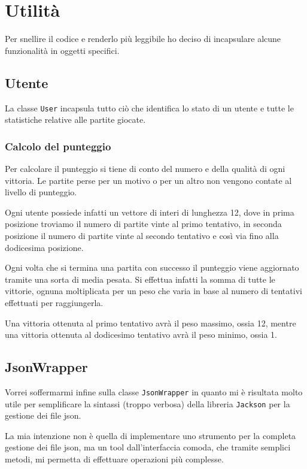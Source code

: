 \section{Utilità}
Per snellire il codice e renderlo più leggibile ho deciso di incapsulare alcune funzionalità in
oggetti specifici.

\subsection{Utente}
La classe \verb|User| incapsula tutto ciò che identifica lo stato di un utente e tutte le
statistiche relative alle partite giocate.

\subsubsection{Calcolo del punteggio}
Per calcolare il punteggio si tiene di conto del numero e della qualità di ogni vittoria. Le
partite perse per un motivo o per un altro non vengono contate al livello di punteggio.

Ogni utente possiede infatti un vettore di interi di lunghezza 12, dove in prima posizione troviamo
il numero di partite vinte al primo tentativo, in seconda posizione il numero di partite vinte al
secondo tentativo e così via fino alla dodicesima posizione.

Ogni volta che si termina una partita con successo il punteggio viene aggiornato tramite una sorta
di media pesata. Si effettua infatti la somma di tutte le vittorie, ognuna moltiplicata per un peso
che varia in base al numero di tentativi effettuati per raggiungerla.

Una vittoria ottenuta al primo tentativo avrà il peso massimo, ossia 12, mentre una vittoria
ottenuta al dodicesimo tentativo avrà il peso minimo, ossia 1.

\subsection{JsonWrapper}
Vorrei soffermarmi infine sulla classe \verb|JsonWrapper| in quanto mi è risultata molto utile per
semplificare la sintassi (troppo verbosa) della libreria \verb|Jackson| per la gestione dei file
json.

La mia intenzione non è quella di implementare uno strumento per la completa gestione dei file
json, ma un tool dall'interfaccia comoda, che tramite semplici metodi, mi permetta di effettuare
operazioni più complesse.


